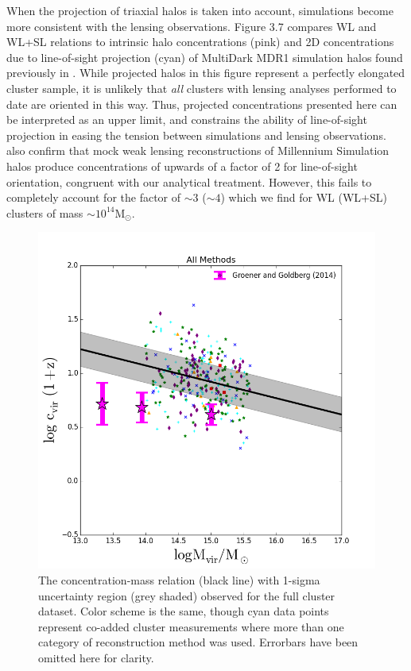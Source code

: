 When the projection of triaxial halos is taken into account, simulations become
more consistent with the lensing observations. Figure 3.7 compares WL and WL+SL
relations to intrinsic halo concentrations (pink) and 2D concentrations due to
line-of-sight projection (cyan) of MultiDark MDR1 simulation halos found
previously in \citet{GR14.1}. While projected halos in this figure represent a
perfectly elongated cluster sample, it is unlikely that {\em all} clusters with
lensing analyses performed to date are oriented in this way. Thus, projected
concentrations presented here can be interpreted as an upper limit, and
constrains the ability of line-of-sight projection in easing the tension between
simulations and lensing observations. \citet{BA12.1} also confirm that mock weak
lensing reconstructions of Millennium Simulation halos produce concentrations
of upwards of a factor of 2 for line-of-sight orientation, congruent with our
analytical treatment. However, this fails to completely account for the factor of
$\mathrm{\sim 3}$ ($\mathrm{\sim 4}$) which we find for WL (WL+SL) clusters
of mass $\mathrm{\sim 10^{14} M_{\odot}}$. 

\begin{figure}
\begin{center}
\includegraphics[width=\textwidth]{./images/CMRelationProject/AllMethodsWithSims_linearmodel_witherror.png}
\end{center}
\caption[The Full c-M Relation]{The concentration-mass relation (black line)
  with 1-sigma uncertainty region (grey shaded) observed for the full cluster
  dataset. Color scheme is the same, though cyan data points represent co-added
  cluster measurements where more than one category of reconstruction method
  was used. Errorbars have been omitted here for clarity.}
\end{figure}

